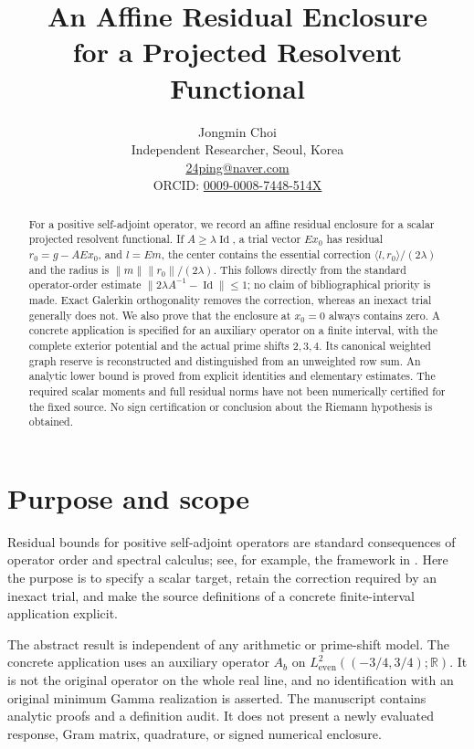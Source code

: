 \documentclass[11pt,a4paper]{article}
\title{An Affine Residual Enclosure\\for a Projected Resolvent Functional}
\author{Jongmin Choi\\[2pt]
\small Independent Researcher, Seoul, Korea\\
\small \href{mailto:24ping@naver.com}{24ping@naver.com}\\
\small ORCID: \href{https://orcid.org/0009-0008-7448-514X}{0009-0008-7448-514X}}
\date{}
\newcommand{\R}{\mathbb R}
\newcommand{\Id}{\operatorname{Id}}
\newcommand{\ip}[2]{\langle #1,#2\rangle}
\newcommand{\norm}[1]{\lVert #1\rVert}
\theoremstyle{remark}
\numberwithin{equation}{section}
\begin{document}
\maketitle
\begin{abstract}
For a positive self-adjoint operator, we record an affine residual enclosure
for a scalar projected resolvent functional. If $A\ge\lambda\Id$, a trial
vector $Ex_0$ has residual $r_0=g-AEx_0$, and $l=Em$, the center contains the
essential correction $\ip{l}{r_0}/(2\lambda)$ and the radius is
$\norm{m}\norm{r_0}/(2\lambda)$. This follows directly from the standard
operator-order estimate $\norm{2\lambda A^{-1}-\Id}\le1$; no claim of
bibliographical priority is made. Exact Galerkin orthogonality removes the
correction, whereas an inexact trial generally does not. We also prove that
the enclosure at $x_0=0$ always contains zero. A concrete application is
specified for an auxiliary operator on a finite interval, with the complete
exterior potential and the actual prime shifts $2,3,4$. Its canonical
weighted graph reserve is reconstructed and distinguished from an
unweighted row sum. An analytic lower bound is proved from explicit
identities and elementary estimates. The required scalar moments and full
residual norms have not been numerically certified for the fixed source.
No sign certification or conclusion about the Riemann hypothesis is obtained.
\end{abstract}

\section{Purpose and scope}
Residual bounds for positive self-adjoint operators are standard consequences
of operator order and spectral calculus; see, for example, the framework in
\cite[Chapter 2]{davies}. Here the purpose is to specify a scalar target,
retain the correction required by an inexact trial, and make the source
definitions of a concrete finite-interval application explicit.

The abstract result is independent of any arithmetic or prime-shift model.
The concrete application uses an auxiliary operator $A_b$ on
$L^2_{\mathrm{even}}((-3/4,3/4);\R)$. It is not the original operator on the
whole real line, and no identification with an original minimum Gamma
realization is asserted. The manuscript contains analytic proofs and a
definition audit. It does not present a newly evaluated response, Gram
matrix, quadrature, or signed numerical enclosure.
\end{document}
